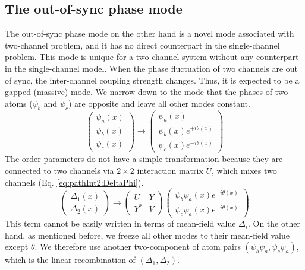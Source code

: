 \documentclass[reprint,pra]{revtex4-1}
\newcommand{\mtrx}[1]{\ensuremath{\begin{pmatrix}#1\end{pmatrix}}}
\newcommand{\av}[1]{\ensuremath{\bigl<{#1}\bigr>}}
\begin{document}
\subsection{The out-of-sync phase mode}



The out-of-sync phase mode on the other hand is a novel mode associated with two-channel problem, and it has no direct counterpart in the single-channel problem.  
 This mode is unique for a two-channel system without any counterpart in the single-channel model.  When  the phase fluctuation of two channels are out of  sync,  the inter-channel coupling strength changes.  Thus, it is  expected to be  a gapped (massive) mode.  We narrow down to the mode that the phases of two atoms  ($\psi_{b}$ and $\psi_{c}$) are opposite and leave all other modes constant.  
\begin{equation*}
\mtrx{\psi_{a}(x)\\\psi_{b}(x)\\\psi_{c}(x)}\rightarrow{}
	\mtrx{\psi_{a}(x)\\\psi_{b}(x)e^{+i\theta(x)}\\\psi_{c}(x)e^{-i\theta(x)}}
\end{equation*}
The order parameters do not have a simple transformation because they are connected to two channels via $2\times2$ interaction matrix $\tilde{U}$, which mixes two channels (Eq. \ref{eq:pathInt2:DeltaPhi}).  
\begin{equation*}
\begin{pmatrix}\Delta_{1}(x)\\\Delta_{2}(x)\end{pmatrix}\rightarrow{}
	\mtrx{U&Y\\Y^{*}&V}\begin{pmatrix}\psi_{b}\psi_{a}(x)e^{+i\theta(x)}\\\psi_{c}\psi_{a}(x)e^{-i\theta(x)}\end{pmatrix}
\end{equation*}
This term cannot be easily written in terms of mean-field value $\Delta_i$.   On the other hand, as mentioned before, we freeze all  other modes to their mean-field value except $\theta$.  We therefore use another two-component of atom pairs $({\psi_{b}\psi_{a}},{\psi_{c}\psi_{a}})$, which is the linear recombination of $(\Delta_{1},\Delta_{2})$.  
 
\end{document}
